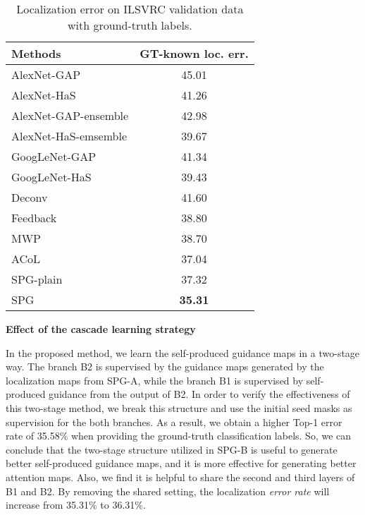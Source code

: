 \documentclass[runningheads]{llncs}
\begin{document}
\begin{table}[t]\setlength{\tabcolsep}{10pt}
  \centering
  \caption{Localization error on ILSVRC validation data with ground-truth labels.}\label{tab-gtloc}
  \begin{tabular}{l|c}
    \hline
    \hline
    Methods & GT-known loc. err. \\
    \hline
    AlexNet-GAP \cite{zhou2015cnnlocalization} & 45.01 \\
    AlexNet-HaS \cite{singh2017hide} & 41.26 \\
    AlexNet-GAP-ensemble \cite{zhou2015cnnlocalization} & 42.98 \\
    AlexNet-HaS-emsemble \cite{singh2017hide} & 39.67 \\
    GoogLeNet-GAP \cite{zhou2015cnnlocalization} & 41.34 \\
    GoogLeNet-HaS \cite{singh2017hide} & 39.43 \\
    Deconv \cite{zeiler2014visualizing} & 41.60 \\
    Feedback \cite{cao2015look} & 38.80 \\
    MWP \cite{zhang2016top} & 38.70 \\
    ACoL \cite{zhang2018adversarial} & 37.04 \\
    \hline
    SPG-plain & 37.32 \\
    SPG  & \textbf{35.31} \\
    \hline
    \hline
  \end{tabular}
\end{table}

\textbf{Effect of the cascade learning strategy}

In the proposed method, we learn the self-produced guidance maps in a two-stage way.
The branch B2 is supervised by the guidance maps generated by the localization maps from SPG-A, while the branch B1 is supervised by self-produced guidance from the output of B2.
In order to verify the effectiveness of this two-stage method, we break this structure and use the initial seed masks as supervision for the both branches.
As a result, we obtain a higher Top-1 error rate of 35.58\% when providing the ground-truth classification labels.
So, we can conclude that the two-stage structure utilized in SPG-B is useful to generate better self-produced guidance maps, and it is more effective for generating better attention maps.
Also, we find it is helpful to share the second and third layers of B1 and B2.
By removing the shared setting, the localization \textit{error rate} will increase from 35.31\% to 36.31\%.
\end{document}
